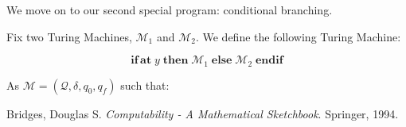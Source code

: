 \documentclass{article}
\newcommand{\M}{\mathcal{M}}
\newcommand{\Q}{\mathcal{Q}}
\DeclareMathOperator{\Nifat}{\mathbf{if\,at}}
\DeclareMathOperator{\Nthen}{\mathbf{then}}
\DeclareMathOperator{\Nelse}{\mathbf{else}}
\DeclareMathOperator{\Nendif}{\mathbf{endif}}
\begin{document}
	We move on to our second special program: conditional branching.
	
	Fix two Turing Machines, $\M_1$ and $\M_2$. We define the following Turing Machine:
	
	\[ \Nifat y \Nthen \M_1 \Nelse \M_2 \Nendif \]
	
	As $\M = (\Q, \delta, q_0, q_f)$ such that:
	
	\begin{itemize}
	
	\end{itemize}

	
\begin{thebibliography}{9}
Bridges, Douglas S.
\textit{Computability - A Mathematical Sketchbook}. 
Springer, 1994. %
\end{thebibliography}	
\end{document}
